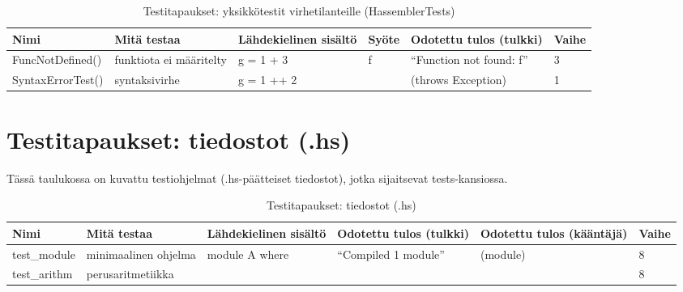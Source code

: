 \documentclass[11pt]{article} %
\begin{document}
\begin{table}[!htbp] %
\caption{Testitapaukset: yksikkötestit virhetilanteille (HassemblerTests)}
\begin{tabular}{|p{3cm}|p{}|p{3cm}|p{}|p{3cm}|p{}|}
\hline
\textbf{Nimi} & \textbf{Mitä testaa} & \textbf{Lähdekielinen sisältö} & \textbf{Syöte}  & \textbf{Odotettu tulos (tulkki)}  & \textbf{Vaihe} \\ \hline
 FuncNotDefined()  & funktiota ei määritelty   &  g = 1 + 3       &  f       &  ``Function not found: f''   &  3            \\ \hline
 SyntaxErrorTest()     & syntaksivirhe   &  g = 1 ++ 2    &           &   (throws Exception)   &    1     \\ \hline
\end{tabular}
\end{table}


\section{Testitapaukset: tiedostot (.hs)}


Tässä taulukossa on kuvattu testiohjelmat (.hs-päätteiset tiedostot), jotka sijaitsevat tests-kansiossa.

\begin{table}[!htbp] %
\caption{Testitapaukset: tiedostot (.hs)}
\begin{tabular}{|p{}|p{}|p{}|p{2cm}|p{3cm}|p{}|}
\hline
\textbf{Nimi} & \textbf{Mitä testaa} & \textbf{Lähdekielinen sisältö} & \textbf{Odotettu tulos (tulkki)} & \textbf{Odotettu tulos (kääntäjä)} & \textbf{Vaihe} \\ \hline
test\_module  &  minimaalinen ohjelma  & module A where &  ``Compiled 1 module''    &    (module)    & 8   \\ \hline
 test\_arithm     & perus\-aritmetiikka         &  &                                  &                                   &   8       \\ \hline
\end{tabular}
\end{table}
\end{document}
